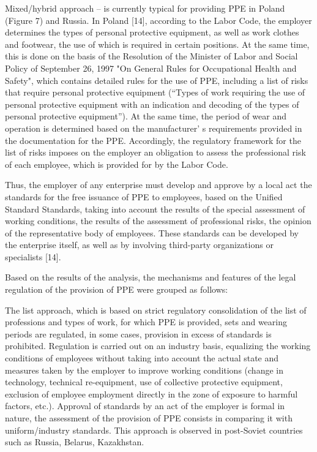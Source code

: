 \begin{multicols}{2}
Mixed/hybrid approach -- is currently typical for providing PPE in
Poland (Figure 7) and Russia. In Poland {[}14{]}, according to the Labor
Code, the employer determines the types of personal protective
equipment, as well as work clothes and footwear, the use of which is
required in certain positions. At the same time, this is done on the
basis of the Resolution of the Minister of Labor and Social Policy of
September 26, 1997 "On General Rules for Occupational Health and
Safety", which contains detailed rules for the use of PPE, including a
list of risks that require personal protective equipment (``Types of
work requiring the use of personal protective equipment with an
indication and decoding of the types of personal protective
equipment''). At the same time, the period of wear and operation is
determined based on the manufacturer' s requirements
provided in the documentation for the PPE. Accordingly, the regulatory
framework for the list of risks imposes on the employer an obligation to
assess the professional risk of each employee, which is provided for by
the Labor Code.

Thus, the employer of any enterprise must develop and approve by a local
act the standards for the free issuance of PPE to employees, based on
the Unified Standard Standards, taking into account the results of the
special assessment of working conditions, the results of the assessment
of professional risks, the opinion of the representative body of
employees. These standards can be developed by the enterprise itself, as
well as by involving third-party organizations or specialists {[}14{]}.

Based on the results of the analysis, the mechanisms and features of the
legal regulation of the provision of PPE were grouped as follows:

The list approach, which is based on strict regulatory consolidation of
the list of professions and types of work, for which PPE is provided,
sets and wearing periods are regulated, in some cases, provision in
excess of standards is prohibited. Regulation is carried out on an
industry basis, equalizing the working conditions of employees without
taking into account the actual state and measures taken by the employer
to improve working conditions (change in technology, technical
re-equipment, use of collective protective equipment, exclusion of
employee employment directly in the zone of exposure to harmful factors,
etc.). Approval of standards by an act of the employer is formal in
nature, the assessment of the provision of PPE consists in comparing it
with uniform/industry standards. This approach is observed in
post-Soviet countries such as Russia, Belarus, Kazakhstan.


\end{multicols}
